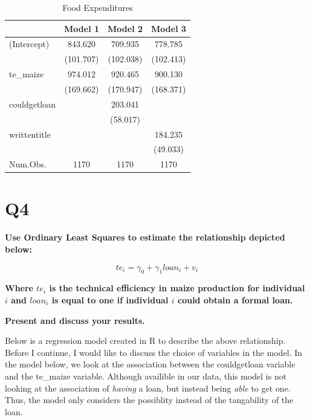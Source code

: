 \documentclass[
]{article}
\begin{document}
\begin{table}

\caption{\label{tab:unnamed-chunk-6}Food Expenditures}
\centering
\begin{tabular}[t]{lccc}
\toprule
  & Model 1 & Model 2 & Model 3\\
\midrule
(Intercept) & \num{843.620} & \num{709.935} & \num{778.785}\\
 & (\num{101.707}) & (\num{102.038}) & (\num{102.413})\\
te\_maize & \num{974.012} & \num{920.465} & \num{900.130}\\
 & (\num{169.662}) & (\num{170.947}) & (\num{168.371})\\
couldgetloan &  & \num{203.041} & \\
 &  & (\num{58.017}) & \\
writtentitle &  &  & \num{184.235}\\
 &  &  & (\num{49.033})\\
\midrule
Num.Obs. & \num{1170} & \num{1170} & \num{1170}\\
\bottomrule
\end{tabular}
\end{table}

\hfill\break

\hfill\break

\hfill\break

\hypertarget{q4}{%
\section{Q4}\label{q4}}

\textbf{Use Ordinary Least Squares to estimate the relationship depicted
below:}

\[te_i = \gamma_0 + \gamma_1 loan_i + v_i\]

\textbf{Where \(te_i\) is the technical efficiency in maize production
for individual \(i\) and \(loan_i\) is equal to one if individual \(i\)
could obtain a formal loan.}

\hfill\break

\textbf{Present and discuss your results.}

\hfill\break
Below is a regression model created in R to describe the above
relationship. Before I continue, I would like to discuss the choice of
variables in the model. In the model below, we look at the association
between the couldgetloan variable and the te\_maize variable. Although
availible in our data, this model is not looking at the association of
\emph{having} a loan, but instead being \emph{able} to get one. Thus,
the model only considers the possiblity instead of the tangability of
the loan.
\end{document}
